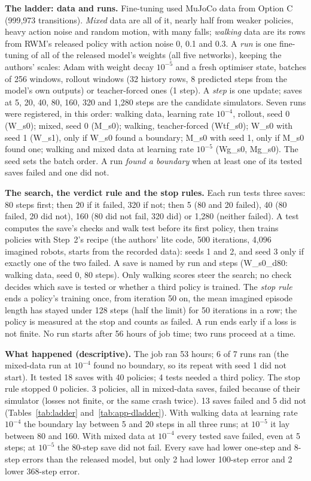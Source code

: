 \textbf{The ladder: data and runs.} Fine-tuning used MuJoCo data from Option C (999{,}973 transitions).
\emph{Mixed} data are all of it, nearly half from weaker policies, heavy action noise and random motion, with many
falls; \emph{walking} data are its rows from RWM's released policy with action noise 0, 0.1 and 0.3. A \emph{run} is one
fine-tuning of all of the released model's weights (all five networks), keeping the authors' scales: Adam with weight
decay $10^{-5}$ and a fresh optimiser state, batches of 256 windows, rollout windows (32 history rows, 8 predicted
steps from the model's own outputs) or teacher-forced ones (1 step). A \emph{step} is one update; saves at 5, 20, 40,
80, 160, 320 and 1,280 steps are the candidate simulators. Seven runs were registered, in this order: walking data,
learning rate $10^{-4}$, rollout, seed 0 (W\_s0); mixed, seed 0 (M\_s0); walking, teacher-forced (Wtf\_s0); W\_s0 with seed 1
(W\_s1), only if W\_s0 found a boundary; M\_s0 with seed 1, only if M\_s0 found one; walking and mixed data at
learning rate $10^{-5}$ (Wg\_s0, Mg\_s0). The seed sets the batch order. A run \emph{found a boundary} when at least one of its tested saves failed
and one did not.

\textbf{The search, the verdict rule and the stop rules.} Each run tests three saves: 80 steps first; then 20 if it
failed, 320 if not; then 5 (80 and 20 failed), 40 (80 failed, 20 did not), 160 (80 did not fail, 320 did) or 1,280 (neither
failed). A test computes the save's checks and walk test before its first policy, then trains policies with Step~2's
recipe (the authors' lite code, 500 iterations, 4,096 imagined robots, starts from the recorded data): seeds 1 and 2,
and seed 3 only if exactly one of the two failed. A save is named by run and steps (W\_s0\_d80: walking data, seed 0,
80 steps). Only walking scores steer the search; no check decides which save is
tested or whether a third policy is trained. The \emph{stop rule} ends a policy's training once, from iteration
50 on, the mean imagined episode length has stayed under 128 steps (half the limit) for
50 iterations in a row; the policy is measured at the stop and counts as failed. A run ends early if a loss
is not finite. No run starts after 56 hours of job time; two runs proceed at a time.

\textbf{What happened (descriptive).} The job ran 53 hours; 6 of 7 runs ran (the mixed-data
run at $10^{-4}$ found no boundary, so its repeat with seed 1 did not start). It tested 18 saves with 40 policies; 4 tests
needed a third policy. The stop rule stopped 0 policies. 3 policies, all in mixed-data saves, failed
because of their simulator (losses not finite, or the same crash twice). 13 saves failed and 5 did
not (Tables~\ref{tab:ladder} and~\ref{tab:app-dladder}). With walking data at learning rate $10^{-4}$ the boundary lay
between 5 and 20 steps in all three runs; at $10^{-5}$ it lay between 80 and 160. With mixed data at $10^{-4}$ every
tested save failed, even at 5 steps; at $10^{-5}$ the 80-step save did not fail. Every save had lower one-step and
8-step errors than the released model, but only 2 had lower 100-step error and 2
lower 368-step error.

